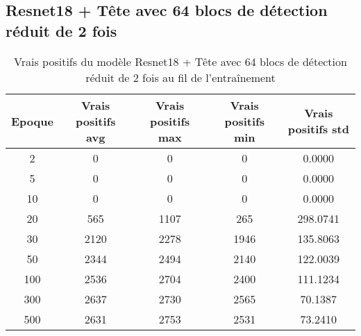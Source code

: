 
\clearpage
\subsection{Resnet18 + Tête avec 64 blocs de détection réduit de 2 fois}

\begin{table}[!ht]
    \caption{Vrais positifs du modèle Resnet18 + Tête avec 64 blocs de détection réduit de 2 fois au fil de l'entraînement}
    \label{tab:resnet18+head_64n_true_positive_reduced_2x_precision}
    \centering
    \begin{tabular}{ |c||c|c|c|c|  }
        \hline
        \rowcolor{gray!50}
        Epoque & Vrais positifs avg & Vrais positifs max & Vrais positifs min & Vrais positifs std\\
        \hline
        2 & 0 & 0 & 0 & 0.0000\\
        5 & 0 & 0 & 0 & 0.0000\\
        10 & 0 & 0 & 0 & 0.0000\\
        20 & 565 & 1107 & 265 & 298.0741\\
        30 & 2120 & 2278 & 1946 & 135.8063\\
        50 & 2344 & 2494 & 2140 & 122.0039\\
        100 & 2536 & 2704 & 2400 & 111.1234\\
        300 & 2637 & 2730 & 2565 & 70.1387\\
        500 & 2631 & 2753 & 2531 & 73.2410\\
        \hline
    \end{tabular}
\end{table}


